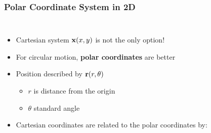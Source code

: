 \documentclass[12pt,compress,aspectratio=169]{beamer}
\newcommand{\mb}[1]{\ensuremath\mathbf{#1}}
\begin{document}
\begin{frame}
  \frametitle{Polar Coordinate System in 2D}
  \begin{columns}
    \begin{itemize}
    \item Cartesian system $\mb{x}(x,y)$ is not the only option!
    \item For circular motion, \textbf{polar coordinates} are better
    \item Position described by $\mb{r}(r,\theta)$
      \begin{itemize}
      \item $r$ is distance from the origin
      \item $\theta$ standard angle
      \end{itemize}
    \item Cartesian coordinates are related to the polar coordinates by:

      \vspace{-.45in}{\large
        \begin{align*}
          x&=r\cos\theta\\
          y&=r\sin\theta
        \end{align*}
      }
    \end{itemize}
  \end{columns}
\end{frame}
\end{document}
